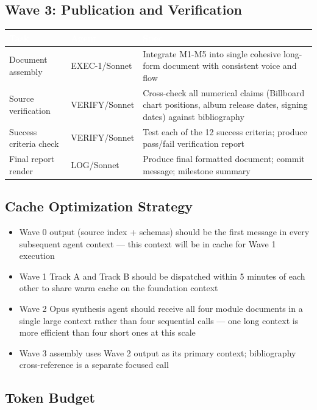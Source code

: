 \documentclass[11pt,letterpaper]{article}
\newcommand{\tableheader}[1]{\textbf{\sffamily\textcolor{white}{#1}}}
\begin{document}
\subsection{Wave 3: Publication and Verification}

\begin{center}
\begin{tabularx}{\textwidth}{L{3cm}L{2cm}X}
\toprule
{}
\tableheader{Task} & \tableheader{Agent} & \tableheader{Spec} \\
\midrule
Document assembly & EXEC-1/Sonnet & Integrate M1-M5 into single cohesive long-form document with consistent voice and flow \\
Source verification & VERIFY/Sonnet & Cross-check all numerical claims (Billboard chart positions, album release dates, signing dates) against bibliography \\
Success criteria check & VERIFY/Sonnet & Test each of the 12 success criteria; produce pass/fail verification report \\
Final report render & LOG/Sonnet & Produce final formatted document; commit message; milestone summary \\
\bottomrule
\end{tabularx}
\end{center}

\subsection{Cache Optimization Strategy}
\begin{itemize}[leftmargin=1.5em]
  \item Wave 0 output (source index + schemas) should be the first message in every subsequent agent context — this context will be in cache for Wave 1 execution
  \item Wave 1 Track A and Track B should be dispatched within 5 minutes of each other to share warm cache on the foundation context
  \item Wave 2 Opus synthesis agent should receive all four module documents in a single large context rather than four sequential calls — one long context is more efficient than four short ones at this scale
  \item Wave 3 assembly uses Wave 2 output as its primary context; bibliography cross-reference is a separate focused call
\end{itemize}

\subsection{Token Budget}
\end{document}
